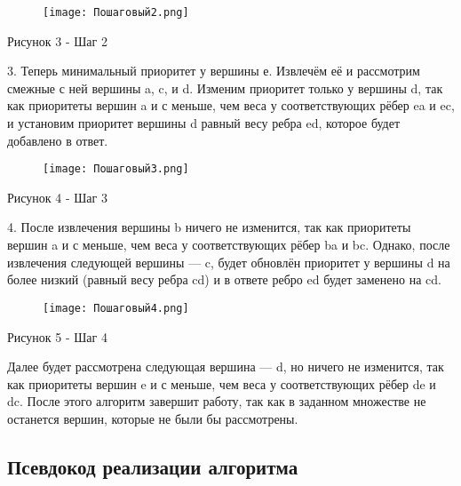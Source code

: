 \documentclass[a4paper,16pt]{article}
\begin{document}
\begin{figure}[h]
    \centering
    \texttt{[image: Пошаговый2.png]}
\end{figure}
\hypertarget{1}{}

\begin{center}
    Рисунок 3 - Шаг 2
\end{center}

3. Теперь минимальный приоритет у вершины е. Извлечём её и рассмотрим смежные с ней вершины a, c, и d. Изменим приоритет только у вершины d, так как приоритеты вершин a и с меньше, чем веса у соответствующих рёбер ea и ec, и установим приоритет вершины d равный весу ребра ed, которое будет добавлено в ответ.
\newpage 
\begin{figure}[h]
    \centering
    \texttt{[image: Пошаговый3.png]}
\end{figure}
\hypertarget{1}{}

\begin{center}
    Рисунок 4 - Шаг 3
\end{center}

4. После извлечения вершины b ничего не изменится, так как приоритеты вершин a и с меньше, чем веса у соответствующих рёбер ba и bc. Однако, после извлечения следующей вершины — c, будет обновлён приоритет у вершины d на более низкий (равный весу ребра cd) и в ответе ребро ed будет заменено на cd.

\begin{figure}[h]
    \centering
    \texttt{[image: Пошаговый4.png]}
\end{figure}
\hypertarget{1}{}

\begin{center}
    Рисунок 5 - Шаг 4
\end{center}

Далее будет рассмотрена следующая вершина — d, но ничего не изменится, так как приоритеты вершин e и с меньше, чем веса у соответствующих рёбер de и dc. После этого алгоритм завершит работу, так как в заданном множестве не останется вершин, которые не были бы рассмотрены.


\begin{center}
   \subsection{Псевдокод реализации алгоритма}
\end{center}
\end{document}
